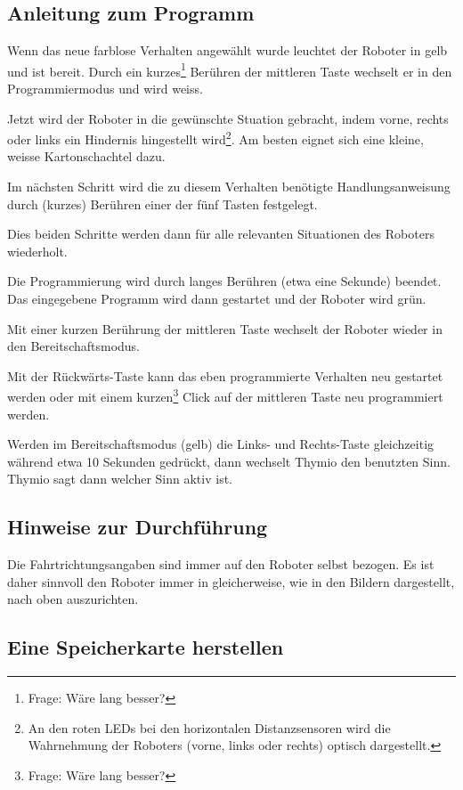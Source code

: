 \documentclass[12pt]{article}
\begin{document}
\subsection*{Anleitung zum Programm}

Wenn das neue farblose Verhalten angewählt wurde leuchtet der Roboter in gelb und ist bereit. Durch ein kurzes\footnote{Frage: Wäre lang besser?} Berühren der mittleren Taste wechselt er in den Programmiermodus und wird weiss. 

Jetzt wird der Roboter in die gewünschte Stuation gebracht, indem vorne, rechts oder links ein Hindernis hingestellt wird\footnote{An den roten LEDs bei den horizontalen Distanzsensoren wird die Wahrnehmung der Roboters (vorne, links oder rechts) optisch dargestellt.}. Am besten eignet sich eine kleine, weisse Kartonschachtel dazu.

Im nächsten Schritt wird die zu diesem Verhalten benötigte Handlungsanweisung durch (kurzes) Berühren einer der fünf Tasten festgelegt.

Dies beiden Schritte werden dann für alle relevanten Situationen des Roboters wiederholt.

Die Programmierung wird durch langes Berühren (etwa eine Sekunde) beendet. Das eingegebene Programm wird dann gestartet und der Roboter wird grün.

Mit einer kurzen Berührung der mittleren Taste wechselt der Roboter wieder in den Bereitschaftsmodus.

Mit der Rückwärts-Taste kann das eben programmierte Verhalten neu gestartet werden oder mit einem kurzen\footnote{Frage: Wäre lang besser?}  Click auf der mittleren Taste neu programmiert werden. 

Werden im Bereitschaftsmodus (gelb) die Links- und Rechts-Taste gleichzeitig während etwa 10 Sekunden gedrückt, dann wechselt Thymio den benutzten Sinn. Thymio sagt dann welcher Sinn aktiv ist.

\subsection*{Hinweise zur Durchführung}

Die Fahrtrichtungsangaben sind immer auf den Roboter selbst bezogen. Es ist daher sinnvoll den Roboter immer in gleicherweise, wie in den Bildern dargestellt, nach oben auszurichten.

\subsection*{Eine Speicherkarte herstellen}
\end{document}
